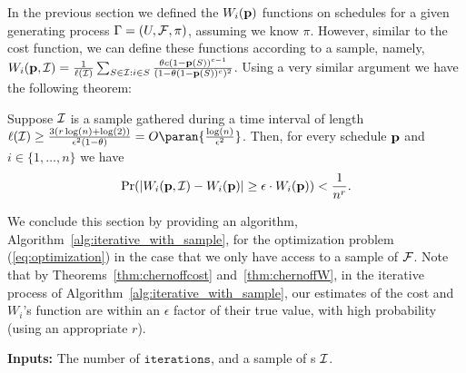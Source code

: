 In the previous section we defined the $W_i(\mathbf{p})$ functions on schedules for a given generating process $\Gamma=(U,\mathcal{F},\pi)$, assuming we know $\pi$. However, similar to the cost function, we can define these functions according to a sample, namely,
$W_i(\mathbf{p},\mathcal{I}) = \frac{1}{\ell(\mathcal{I})}\sum_{S\in \mathcal{I}: i\in S} \frac{\theta c (1-\mathbf{p}(S))^{c-1}}{(1-\theta(1-\mathbf{p}(S))^c)^2}$.
Using a very similar argument we have the following theorem:
\begin{theorem}\label{thm:chernoffW}
 Suppose $\mathcal{I}$ is a sample gathered during a time interval of length
 $\ell(\Sample) \geq \frac{3(r\log(n)+\log(2))}{\epsilon^2(1-\theta)} =
 O\paran{\frac{\log(n)}{\epsilon^2}}$. Then, for every schedule $\mathbf{p}$ and
 $i\in\{1,\dots,n\}$ we have
 $$\Pr(|W_i(\mathbf{p},\mathcal{I}) - W_i(\mathbf{p})|\geq \epsilon\cdot W_i(\mathbf{p})) < \frac{1}{n^r}.$$
\end{theorem}

We conclude this section by providing an algorithm, Algorithm~\ref{alg:iterative_with_sample}, for the optimization problem (\ref{eq:optimization}) in the case that we only have access to a sample of $\mathcal{F}$. Note that by Theorems~\ref{thm:chernoffcost} and~\ref{thm:chernoffW}, in the iterative process of Algorithm~\ref{alg:iterative_with_sample}, our estimates of the cost and $W_i$'s function are within an $\epsilon$ factor of their true value, with high probability (using an appropriate $r$).

\begin{algorithm}[!h]
\BlankLine
{\bf Inputs:} The number of  $\texttt{iterations}$, and a sample of {\ins}s $\mathcal{I}$.

\caption{$\appoptimizer(\texttt{iterations},\Sample)$}\label{alg:iterative_with_sample}
\end{algorithm}









